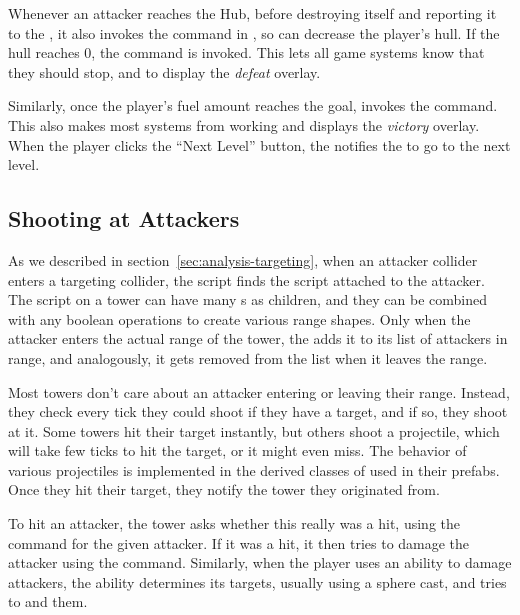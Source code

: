 Whenever an attacker reaches the Hub, before destroying itself and reporting it to the , it also invokes the command  in , so  can decrease the player's hull.
If the hull reaches 0, the command  is invoked.
This lets all game systems know that they should stop, and to display the \emph{defeat} overlay.

Similarly, once the player's fuel amount reaches the goal,  invokes the  command.
This also makes most systems from working and displays the \emph{victory} overlay.
When the player clicks the \enquote{Next Level} button, the  notifies the  to go to the next level.

\subsection{Shooting at Attackers}

As we described in section~\ref{sec:analysis-targeting}, when an attacker collider enters a targeting collider, the  script finds the  script attached to the attacker.
The  script on a tower can have many s as children, and they can be combined with any boolean operations to create various range shapes.
Only when the attacker enters the actual range of the tower, the  adds it to its list of attackers in range, and analogously, it gets removed from the list when it leaves the range.

Most towers don't care about an attacker entering or leaving their range.
Instead, they check every tick they could shoot if they have a target, and if so, they shoot at it.
Some towers hit their target instantly, but others shoot a projectile, which will take few ticks to hit the target, or it might even miss.
The behavior of various projectiles is implemented in the derived classes of  used in their prefabs.
Once they hit their target, they notify the tower they originated from.

To hit an attacker, the tower asks whether this really was a hit, using the  command for the given attacker.
If it was a hit, it then tries to damage the attacker using the  command.
Similarly, when the player uses an ability to damage attackers, the ability determines its targets, usually using a sphere cast, and tries to  and  them.

